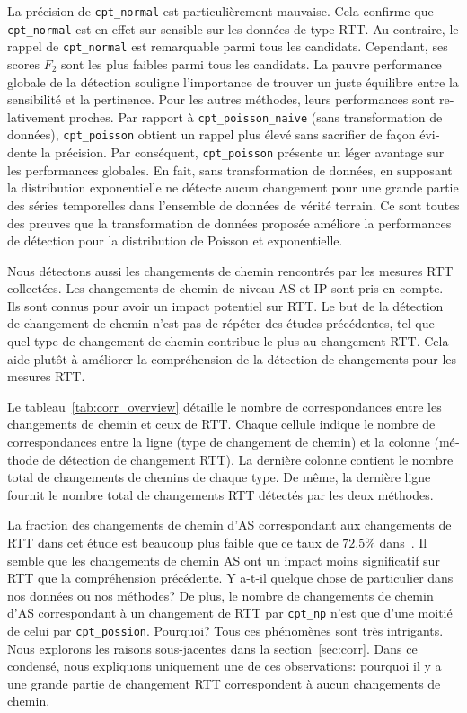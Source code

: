 \begin{otherlanguage}{french}
La précision de \texttt{cpt\_normal} est particulièrement mauvaise.
Cela confirme que \texttt{cpt\_normal} est en effet sur-sensible sur les données de type RTT.
Au contraire, le rappel de \texttt{cpt\_normal} est remarquable parmi tous les candidats.
Cependant, ses scores $F_2$ sont les plus faibles parmi tous les candidats.
La pauvre performance globale de la détection souligne l'importance de trouver un juste équilibre entre la sensibilité et la pertinence.
Pour les autres méthodes, leurs performances sont relativement proches.
Par rapport à \texttt{cpt\_poisson\_naive} (sans transformation de données), 
\texttt{cpt\_poisson} obtient un rappel plus élevé sans sacrifier de façon évidente la précision.
Par conséquent, \texttt{cpt\_poisson} présente un léger avantage sur les performances globales.
En fait, sans transformation de données, en supposant la distribution exponentielle ne détecte 
aucun changement pour une grande partie des séries temporelles dans l'ensemble de données de vérité terrain.
Ce sont toutes des preuves que la transformation de données proposée améliore 
la performances de détection pour la distribution de Poisson et exponentielle.

Nous détectons aussi les changements de chemin rencontrés par les mesures RTT collectées.
Les changements de chemin de niveau AS et IP sont pris en compte.
Ils sont connus pour avoir un impact potentiel sur RTT.
Le but de la détection de changement de chemin n'est pas de répéter des études précédentes,
tel que quel type de changement de chemin contribue le plus au changement RTT.
Cela aide plutôt à améliorer la compréhension de la détection de changements pour les mesures RTT.

Le tableau~\ref{tab:corr_overview} détaille le nombre de correspondances entre les changements de chemin et ceux de RTT.
Chaque cellule indique le nombre de correspondances entre la ligne (type de changement de chemin) et 
la colonne (méthode de détection de changement RTT).
La dernière colonne contient le nombre total de changements de chemins de chaque type.
De même, la dernière ligne fournit le nombre total de changements RTT détectés par les deux méthodes.

La fraction des changements de chemin d'AS correspondant aux changements de RTT dans cet étude 
est beaucoup plus faible que ce taux de $72.5\%$ dans~\cite{Rimondini2014}.
Il semble que les changements de chemin AS ont un impact moins significatif sur RTT que la compréhension précédente.
Y a-t-il quelque chose de particulier dans nos données ou nos méthodes?
De plus, le nombre de changements de chemin d'AS correspondant à un changement de RTT par \texttt{cpt\_np} 
n'est que d'une moitié de celui par \texttt{cpt\_possion}. Pourquoi?
Tous ces phénomènes sont très intrigants.
Nous explorons les raisons sous-jacentes dans la section~\ref{sec:corr}.
Dans ce condensé, nous expliquons uniquement une de ces observations: 
pourquoi il y a une grande partie de changement RTT correspondent à aucun changements de chemin.


\end{otherlanguage}
